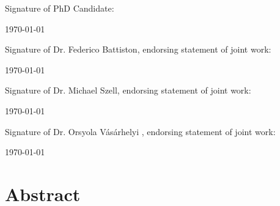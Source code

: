 \documentclass[a4paper,twoside,12pt]{book}
\begin{document}
\vspace{0.5cm}
\noindent
Signature of PhD Candidate:

\vspace{2cm}
\noindent
\monthyeardate\today


\vspace{3.5cm}
\noindent
Signature of Dr. Federico Battiston, endorsing statement of joint work:

\vspace{2cm}
\noindent
\monthyeardate\today


\vspace{3.5cm}
\noindent
Signature of Dr. Michael Szell, endorsing statement of joint work:

\vspace{2cm}
\noindent
\monthyeardate\today

\vspace{3.5cm}
\noindent
Signature of Dr. Orsyola V\'as\'arhelyi , endorsing statement of joint work:

\vspace{2cm}
\noindent
\monthyeardate\today




\chapter*{Abstract}

\end{document}
